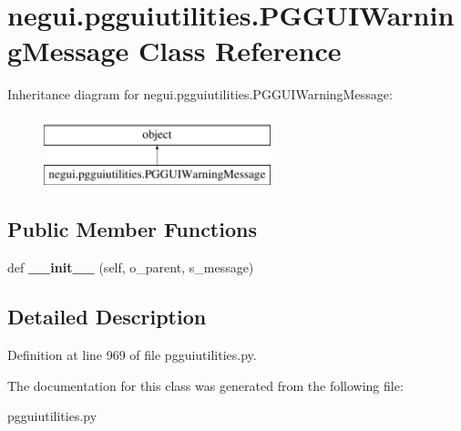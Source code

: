 \hypertarget{classnegui_1_1pgguiutilities_1_1PGGUIWarningMessage}{}\section{negui.\+pgguiutilities.\+P\+G\+G\+U\+I\+Warning\+Message Class Reference}
\label{classnegui_1_1pgguiutilities_1_1PGGUIWarningMessage}
Inheritance diagram for negui.\+pgguiutilities.\+P\+G\+G\+U\+I\+Warning\+Message\+:\begin{figure}[H]
\begin{center}
\leavevmode
\includegraphics[height=2.000000cm]{classnegui_1_1pgguiutilities_1_1PGGUIWarningMessage}
\end{center}
\end{figure}
\subsection*{Public Member Functions}
\begin{DoxyCompactItemize}
\item 
def {\bfseries \+\_\+\+\_\+init\+\_\+\+\_\+} (self, o\+\_\+parent, s\+\_\+message)\hypertarget{classnegui_1_1pgguiutilities_1_1PGGUIWarningMessage_a0ac338d8bcaa1e19be56a0b71a222d6e}{}\label{classnegui_1_1pgguiutilities_1_1PGGUIWarningMessage_a0ac338d8bcaa1e19be56a0b71a222d6e}

\end{DoxyCompactItemize}


\subsection{Detailed Description}


Definition at line 969 of file pgguiutilities.\+py.



The documentation for this class was generated from the following file\+:\begin{DoxyCompactItemize}
\item 
pgguiutilities.\+py\end{DoxyCompactItemize}

